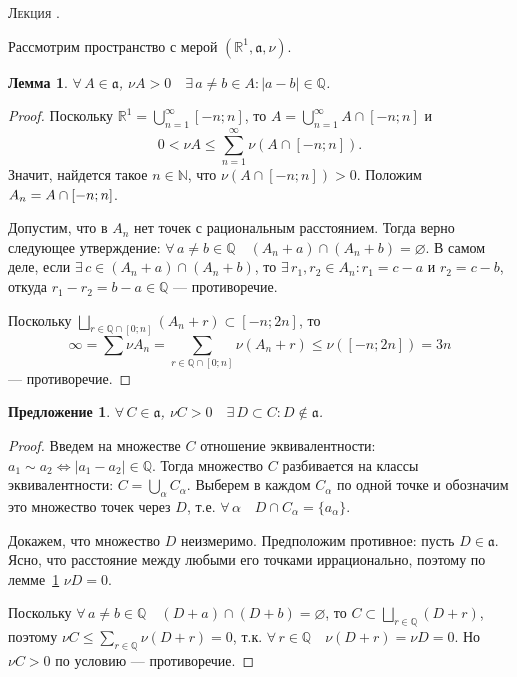 \documentclass[12pt,titlepage]{article}
\newcounter{lec}
\renewcommand{\thelec}{\arabic{lec}}
\newcommand*{\lecture}{\refstepcounter{lec}\vspace{20pt}
\begin{center}{\rmfamily\textsc{Лекция \thelec.}}
\end{center}}
\newcounter{tema}
\newtheorem{lemm}{Лемма}[tema]
\newtheorem{predl}{Предложение}[tema]
\theoremstyle{definition}
\newcommand*{\p}[1]{#1\nobreak\discretionary{}{\hbox{$\mathsurround=0pt #1$}}{}}
\begin{document}
\lecture

Рассмотрим пространство с мерой $(\mathbb{R}^1, \mathfrak{a}, \nu)$.

\begin{lemm}
\label{rashional.points}$\forall\, A\in\mathfrak{a}$, $\nu A>0\quad
\exists\, a\neq b\in A: |a-b|\in\mathbb{Q}$.
\end{lemm}

\begin{proof}
Поскольку $\mathbb{R}^1=\bigcup\limits_{n=1}^\infty [-n;n]$, то
$A=\bigcup\limits_{n=1}^\infty A\cap[-n;n]$ и $$0<\nu
A\leqslant\sum\limits_{n=1}^\infty \nu(A\cap[-n;n]).$$ Значит,
найдется такое $n\in\mathbb{N}$, что $\nu(A\cap[-n;n])>0$. Положим
$A_n\p=A\cap[-n;n]$.

Допустим, что в $A_n$ нет точек с рациональным расстоянием. Тогда
верно следующее утверждение: $\forall\, a\neq b\in \mathbb{Q}\quad
(A_n+a)\cap(A_n+b)=\varnothing$. В самом деле, если $\exists\,
c\in(A_n+a)\cap(A_n+b)$, то $\exists\, r_1,r_2\in A_n: r_1=c-a$ и
$r_2=c-b$, откуда $r_1-r_2=b-a\in\mathbb{Q}$ --- противоречие.

Поскольку $\bigsqcup\limits_{r\in\mathbb{Q}\cap[0;n]}(A_n+r)\subset
[-n;2n]$, то $$\infty=\sum\nu
A_n=\sum\limits_{r\in\mathbb{Q}\cap[0;n]}\nu(A_n+r)\leqslant
\nu([-n;2n])=3n$$ --- противоречие.
\end{proof}

\begin{predl}
$\forall\, C\in\mathfrak{a}$, $\nu C>0\quad \exists\, D\subset
C:D\not \in \mathfrak{a}$.
\end{predl}

\begin{proof}
Введем на множестве $C$ отношение эквивалентности: $a_1\sim
a_2\Leftrightarrow |a_1-a_2|\in\mathbb{Q}$. Тогда множество $C$
разбивается на классы эквивалентности: $C=\bigcup\limits_\alpha
C_\alpha$. Выберем в каждом $C_\alpha$ по одной точке и обозначим
это множество точек через $D$, т.е. $\forall\,\alpha\quad D\cap
C_\alpha=\{a_\alpha\}$.

Докажем, что множество $D$ неизмеримо. Предположим противное: пусть
$D\in\mathfrak{a}$. Ясно, что расстояние между любыми его точками
иррационально, поэтому по лемме~\ref{rashional.points} $\nu D=0$.

Поскольку $\forall\, a\neq b\in \mathbb{Q}\quad
(D+a)\cap(D+b)=\varnothing$, то $C\subset
\bigsqcup\limits_{r\in\mathbb{Q}}(D+r)$, поэтому $\nu C\leqslant
\sum\limits_{r\in\mathbb{Q}}\nu(D+r)=0$, т.к. $\forall\,
r\in\mathbb{Q}\quad \nu(D+r)=\nu D=0$. Но $\nu C>0$ по условию ---
противоречие.
\end{proof}
\end{document}
